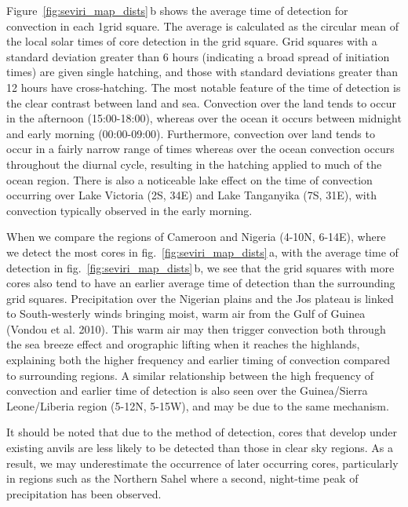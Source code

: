 Figure~\ref{fig:seviri_map_dists}\,b shows the average time of detection for convection in each
1\textdegree grid square. The average is calculated as the circular mean of the
local solar times of core detection in the grid square. Grid squares
with a standard deviation greater than 6 hours (indicating a broad
spread of initiation times) are given single hatching, and those with
standard deviations greater than 12 hours have cross-hatching. The most
notable feature of the time of detection is the clear contrast between
land and sea. Convection over the land tends to occur in the afternoon
(15:00-18:00), whereas over the ocean it occurs between midnight and
early morning (00:00-09:00). Furthermore, convection over land tends to
occur in a fairly narrow range of times whereas over the ocean
convection occurs throughout the diurnal cycle, resulting in the
hatching applied to much of the ocean region. There is also a noticeable
lake effect on the time of convection occurring over Lake Victoria (2\textdegree S,
34\textdegree E) and Lake Tanganyika (7\textdegree S, 31\textdegree E), with convection typically
observed in the early morning.

When we compare the regions of Cameroon and Nigeria (4-10\textdegree N, 6-14\textdegree E),
where we detect the most cores in fig.~\ref{fig:seviri_map_dists}\,a, with the average time of
detection in fig.~\ref{fig:seviri_map_dists}\,b, we see that the grid squares with more cores
also tend to have an earlier average time of detection than the
surrounding grid squares. Precipitation over the Nigerian plains and the
Jos plateau is linked to South-westerly winds bringing moist, warm air
from the Gulf of Guinea (Vondou et al. 2010). This warm air may then
trigger convection both through the sea breeze effect and orographic
lifting when it reaches the highlands, explaining both the higher
frequency and earlier timing of convection compared to surrounding
regions. A similar relationship between the high frequency of convection
and earlier time of detection is also seen over the Guinea/Sierra
Leone/Liberia region (5-12\textdegree N, 5-15\textdegree W), and may be due to the same
mechanism.

It should be noted that due to the method of detection, cores that
develop under existing anvils are less likely to be detected than those
in clear sky regions. As a result, we may underestimate the occurrence
of later occurring cores, particularly in regions such as the Northern
Sahel where a second, night-time peak of precipitation has been
observed.


